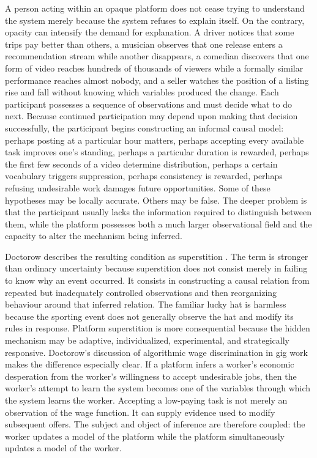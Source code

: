 \documentclass[11pt]{article}
\begin{document}
A person acting within an opaque platform does not cease trying to understand the system merely because the system refuses to explain itself. On the contrary, opacity can intensify the demand for explanation. A driver notices that some trips pay better than others, a musician observes that one release enters a recommendation stream while another disappears, a comedian discovers that one form of video reaches hundreds of thousands of viewers while a formally similar performance reaches almost nobody, and a seller watches the position of a listing rise and fall without knowing which variables produced the change. Each participant possesses a sequence of observations and must decide what to do next. Because continued participation may depend upon making that decision successfully, the participant begins constructing an informal causal model: perhaps posting at a particular hour matters, perhaps accepting every available task improves one's standing, perhaps a particular duration is rewarded, perhaps the first few seconds of a video determine distribution, perhaps a certain vocabulary triggers suppression, perhaps consistency is rewarded, perhaps refusing undesirable work damages future opportunities. Some of these hypotheses may be locally accurate. Others may be false. The deeper problem is that the participant usually lacks the information required to distinguish between them, while the platform possesses both a much larger observational field and the capacity to alter the mechanism being inferred.

Doctorow describes the resulting condition as superstition \citep{doctorowfox2026}. The term is stronger than ordinary uncertainty because superstition does not consist merely in failing to know why an event occurred. It consists in constructing a causal relation from repeated but inadequately controlled observations and then reorganizing behaviour around that inferred relation. The familiar lucky hat is harmless because the sporting event does not generally observe the hat and modify its rules in response. Platform superstition is more consequential because the hidden mechanism may be adaptive, individualized, experimental, and strategically responsive. Doctorow's discussion of algorithmic wage discrimination in gig work \citep{dubal2023algorithmic,calo2015digitalmarket} makes the difference especially clear. If a platform infers a worker's economic desperation from the worker's willingness to accept undesirable jobs, then the worker's attempt to learn the system becomes one of the variables through which the system learns the worker. Accepting a low-paying task is not merely an observation of the wage function. It can supply evidence used to modify subsequent offers. The subject and object of inference are therefore coupled: the worker updates a model of the platform while the platform simultaneously updates a model of the worker.
\end{document}
